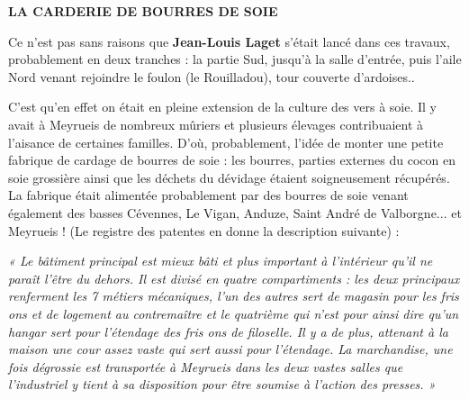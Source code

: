 
\begin{center}
    {\Large\bfseries LA CARDERIE DE BOURRES DE SOIE}
\end{center}

\vspace{0.55cm}

Ce n’est pas sans raisons que \textbf{Jean-Louis Laget} s’était lancé dans ces travaux,
probablement en deux tranches : la partie Sud, jusqu’à la salle d’entrée, puis l’aile
Nord venant rejoindre le foulon (le Rouilladou), tour couverte d’ardoises..

\vspace{0.35cm}

C’est qu’en effet on était en pleine extension de la culture des vers à soie. Il y avait à
Meyrueis de nombreux mûriers et plusieurs élevages contribuaient à l’aisance de
certaines familles. D’où, probablement, l’idée de monter une petite fabrique de
cardage de bourres de soie : les bourres, parties externes du cocon en soie grossière
ainsi que les déchets du dévidage étaient soigneusement récupérés. La fabrique était
alimentée probablement par des bourres de soie venant également des basses
Cévennes, Le Vigan, Anduze, Saint André de Valborgne... et Meyrueis ! (Le registre
des patentes en donne la description suivante) :

\vspace{0.25cm}

\begin{flushleft}
\hspace{0.35cm}
\parbox{0.88\textwidth}{
\textit{
« Le bâtiment principal est mieux bâti et plus important à l’intérieur qu’il ne
paraît l’être du dehors. Il est divisé en quatre compartiments : les deux
principaux renferment les 7 métiers mécaniques, l’un des autres sert de magasin
pour les fris ons et de logement au contremaître et le quatrième qui n’est pour
ainsi dire qu’un hangar sert pour l’étendage des fris ons de filoselle.
Il y a de plus, attenant à la maison une cour assez vaste qui sert aussi pour
l’étendage.
La marchandise, une fois dégrossie est transportée à Meyrueis dans les deux
vastes salles que l’industriel y tient à sa disposition pour être soumise à l’action
des presses. »
}
}
\end{flushleft}

\vspace{0.25cm}

